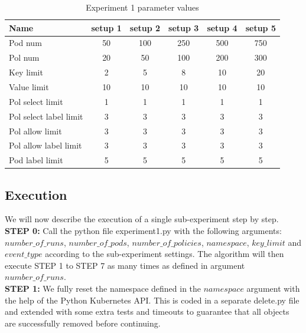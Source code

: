 \begin{table}[H]
    \centering
    \begin{tabular}{|l|c|c|c|c|c|}
        \hline
        \textbf{Name} & \textbf{setup 1} & \textbf{setup 2} & \textbf{setup 3} & \textbf{setup 4} & \textbf{setup 5}\\
        \hline
        Pod num & 50 & 100 & 250 & 500 & 750 \\
        Pol num & 20 & 50 & 100 & 200 & 300 \\
        Key limit & 2 & 5 & 8 & 10 & 20 \\
        Value limit & 10 & 10 & 10 & 10 & 10 \\
        Pol select limit & 1 & 1 & 1 & 1 & 1 \\
        Pol select label limit & 3 & 3 & 3 & 3 & 3 \\
        Pol allow limit & 3 & 3 & 3 & 3 & 3 \\
        Pol allow label limit & 3 & 3 & 3 & 3 & 3 \\
        Pod label limit & 5 & 5 & 5 & 5 & 5 \\
        \hline
    \end{tabular}
    \caption{Experiment 1 parameter values}
    \label{tab:exp1pars}
\end{table}

\subsection{Execution} \label{exp1:execution}
 We will now describe the execution of a single sub-experiment step by step.
\\[10pt]

\textbf{STEP 0:} Call the python file experiment1.py with the following arguments: $number\_of\_runs$, $number\_of\_pods$, $number\_of\_policies$, $namespace$, $key\_limit$ and $event\_type$ according to the sub-experiment settings. The algorithm will then execute STEP 1 to STEP 7 as many times as defined in argument $number\_of\_runs$.
\\[10pt]

\textbf{STEP 1:} We fully reset the namespace defined in the $namespace$ argument with the help of the Python Kubernetes API. This is coded in a separate delete.py file and extended with some extra tests and timeouts to guarantee that all objects are successfully removed before continuing.
\\[10pt]

